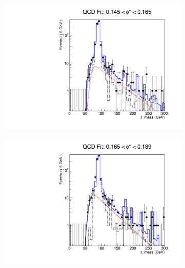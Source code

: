 \begin{figure}[!htbp]
    \centering
    \begin{subfigure}[b]{0.5\textwidth}
        \includegraphics[width=\linewidth]{figures/qcd_fits/qcd_fit_plot_for_21.pdf}
        \caption{}
        \label{fig:qcd_fit_21}
    \end{subfigure}%
    \begin{subfigure}[b]{0.5\textwidth}
        \includegraphics[width=\linewidth]{figures/qcd_fits/qcd_fit_plot_for_22.pdf}
        \caption{}
        \label{fig:qcd_fit_22}
    \end{subfigure}
    \begin{subfigure}[b]{0.5\textwidth}

\end{subfigure}
\end{figure}

